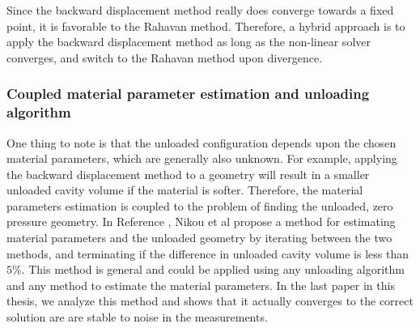 Since the backward displacement method really does converge towards a
fixed point, it is favorable to the Rahavan method. Therefore, a
hybrid approach is to apply the backward displacement method as
long as the non-linear solver converges, and switch to the Rahavan
method upon divergence.


\subsubsection{Coupled material parameter estimation and unloading
  algorithm}
\label{sec:intro_coupled_material}
One thing to note is that the unloaded configuration depends upon the
chosen material parameters, which are generally also unknown. For
example, applying the backward displacement method to a geometry will
result in a smaller unloaded cavity volume if the material is softer.
Therefore, the material parameters estimation is coupled to the
problem of finding the unloaded, zero pressure geometry.
In Reference \cite{nikou2016effects}, Nikou et al propose a method for estimating
material parameters and the unloaded geometry by iterating between
the two methods, and terminating if the difference in unloaded cavity
volume is less than $5 \%$. This method is general and could be applied
using any unloading algorithm and any method to estimate the material
parameters. In the last paper in this thesis, we analyze this method
and shows that it actually converges to the correct solution are are
stable to noise in the measurements. 


  
